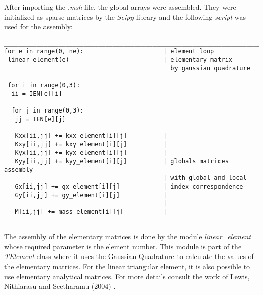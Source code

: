 After importing the \textit{.msh} file, the global arrays 
were assembled. They were initialized as sparse matrices by 
the \textit{Scipy} library \cite{scipy} and the following 
\textit{script} was used for the assembly:



\begin{verbatim}
__________________________________________________________________________
for e in range(0, ne):                      | element loop 
 linear_element(e)                          | elementary matrix
                                              by gaussian quadrature

 for i in range(0,3):                       
  ii = IEN[e][i]                            
  
  for j in range(0,3):                       
   jj = IEN[e][j]
                                            
   Kxx[ii,jj] += kxx_element[i][j]          |
   Kxy[ii,jj] += kxy_element[i][j]          |
   Kyx[ii,jj] += kyx_element[i][j]          |
   Kyy[ii,jj] += kyy_element[i][j]          | globals matrices assembly
                                            | with global and local 
   Gx[ii,jj] += gx_element[i][j]            | index correspondence
   Gy[ii,jj] += gy_element[i][j]            | 
                                            |
   M[ii,jj] += mass_element[i][j]           |
__________________________________________________________________________
\end{verbatim}


\medskip
The assembly of the elementary matrices is done by the module 
\textit{linear\_element} whose required parameter is the 
element number. This module is part of the \textit{TElement} 
class where it uses the Gaussian Quadrature to calculate 
the values of the elementary matrices. For the linear 
triangular element, it is also possible to use elementary 
analytical matrices. For more details consult the work of Lewis, 
Nithiarasu and Seetharamu (2004) \cite{lewis2004}.

